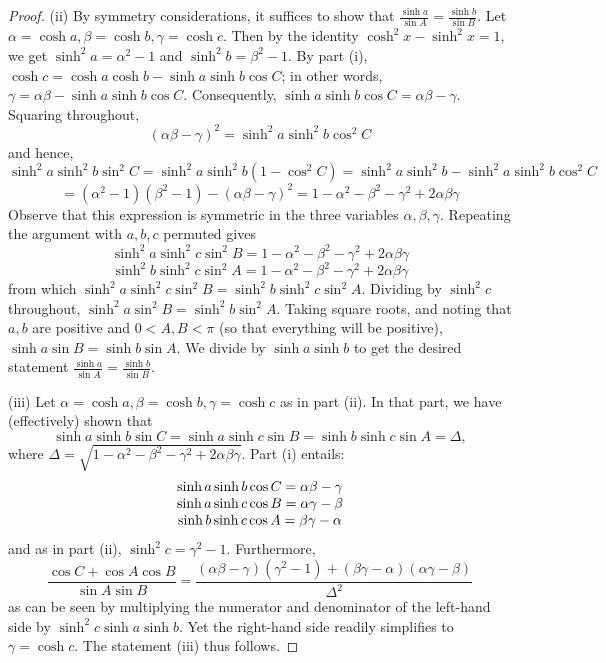 \documentclass[leqno]{book}
\begin{document}
\begin{proof}
(ii) By symmetry considerations, it suffices to show that $\frac{\sinh a}{\sin A}=\frac{\sinh b}{\sin B}$.  Let $\alpha=\cosh a,\beta=\cosh b,\gamma=\cosh c$.  Then by the identity $\cosh^2x-\sinh^2x=1$, we get $\sinh^2a=\alpha^2-1$ and $\sinh^2b=\beta^2-1$.  By part (i), $\cosh c=\cosh a\cosh b-\sinh a\sinh b\cos C$; in other words, $\gamma=\alpha\beta-\sinh a\sinh b\cos C$.  Consequently, $\sinh a\sinh b\cos C=\alpha\beta-\gamma$.  Squaring throughout,
$$(\alpha\beta-\gamma)^2=\sinh^2a\sinh^2b\cos^2C$$
and hence,
$$\sinh^2a\sinh^2b\sin^2C=\sinh^2a\sinh^2b(1-\cos^2C)=\sinh^2a\sinh^2b-\sinh^2a\sinh^2b\cos^2C$$
$$=(\alpha^2-1)(\beta^2-1)-(\alpha\beta-\gamma)^2=1-\alpha^2-\beta^2-\gamma^2+2\alpha\beta\gamma$$
Observe that this expression is symmetric in the three variables $\alpha,\beta,\gamma$.  Repeating the argument with $a,b,c$ permuted gives
$$\sinh^2a\sinh^2c\sin^2B=1-\alpha^2-\beta^2-\gamma^2+2\alpha\beta\gamma$$
$$\sinh^2b\sinh^2c\sin^2A=1-\alpha^2-\beta^2-\gamma^2+2\alpha\beta\gamma$$
from which $\sinh^2a\sinh^2c\sin^2B=\sinh^2b\sinh^2c\sin^2A$.  Dividing by $\sinh^2c$ throughout, $\sinh^2a\sin^2B=\sinh^2b\sin^2A$.  Taking square roots, and noting that $a,b$ are positive and $0<A,B<\pi$ (so that everything will be positive), $\sinh a\sin B=\sinh b\sin A$.  We divide by $\sinh a\sinh b$ to get the desired statement $\frac{\sinh a}{\sin A}=\frac{\sinh b}{\sin B}$.

(iii) Let $\alpha=\cosh a,\beta=\cosh b,\gamma=\cosh c$ as in part (ii).  In that part, we have (effectively) shown that
$$\sinh a\sinh b\sin C=\sinh a\sinh c\sin B=\sinh b\sinh c\sin A=\Delta,$$
where $\Delta=\sqrt{1-\alpha^2-\beta^2-\gamma^2+2\alpha\beta\gamma}$.  Part (i) entails:
$$\begin{array}{c l}\sinh a\sinh b\cos C=\alpha\beta-\gamma\\\sinh a\sinh c\cos B=\alpha\gamma-\beta\\\sinh b\sinh c\cos A=\beta\gamma-\alpha\end{array}$$
and as in part (ii), $\sinh^2c=\gamma^2-1$.  Furthermore,
$$\frac{\cos C+\cos A\cos B}{\sin A\sin B}=\frac{(\alpha\beta-\gamma)(\gamma^2-1)+(\beta\gamma-\alpha)(\alpha\gamma-\beta)}{\Delta^2}$$
as can be seen by multiplying the numerator and denominator of the left-hand side by $\sinh^2c\sinh a\sinh b$.  Yet the right-hand side readily simplifies to $\gamma=\cosh c$.  The statement (iii) thus follows.
\end{proof}
\end{document}
